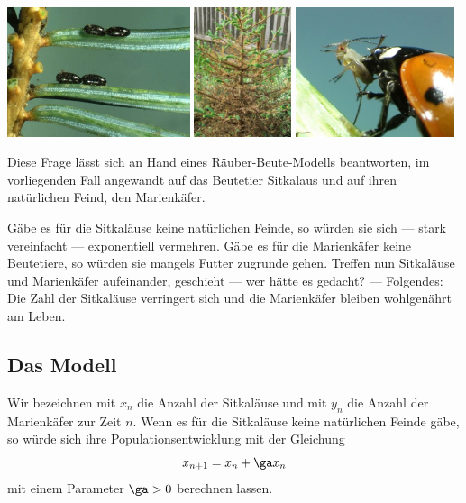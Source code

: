 \documentclass[%
11pt,%
twoside,%
titlepage,%
german,%
headsepline%
]{scrartcl}
\begin{document}
\begin{center}
\includegraphics[height=3.8cm]{pictures/sitkalauseier.jpg}
\includegraphics[height=3.8cm]{pictures/tannenbaum.jpg}
\includegraphics[height=3.8cm]{pictures/marienkaefer.jpg}
\end{center}

Diese Frage lässt sich an Hand eines Räuber-Beute-Modells beantworten, im vorliegenden Fall angewandt auf das Beutetier Sitkalaus und auf ihren natürlichen Feind, den Marienkäfer.

Gäbe es für die Sitkaläuse keine natürlichen Feinde, so würden sie sich --- stark vereinfacht --- exponentiell vermehren. Gäbe es für die Marienkäfer keine Beutetiere, so würden sie mangels Futter zugrunde gehen. Treffen nun Sitkaläuse und Marienkäfer aufeinander, geschieht --- wer hätte es gedacht? --- Folgendes: Die Zahl der Sitkaläuse verringert sich und die Marienkäfer bleiben wohlgenährt am Leben.

\subsection{Das Modell}
Wir bezeichnen mit $x_n$ die Anzahl der Sitkaläuse und mit $y_n$ die Anzahl der Marienkäfer zur Zeit $n$.
Wenn es für die Sitkaläuse keine natürlichen Feinde gäbe, so würde sich ihre Populationsentwicklung mit der Gleichung
$$x_{n+1}=x_n+\ga x_n$$
mit einem Parameter $\ga > 0$ berechnen lassen.
\end{document}

